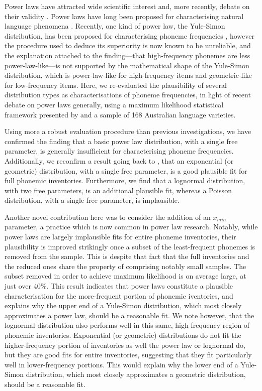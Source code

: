 Power laws have attracted wide scientific interest and, more recently, debate on their validity \autocites{clauset_power-law_2009}{stumpf_critical_2012}. Power laws have long been proposed for characterising natural language phenomena \autocites{estoup_gammes_1916}{zipf_selective_1932}{zipf_human_1949}. Recently, one kind of power law, the Yule-Simon distribution, has been proposed for characterising phoneme frequencies \autocites{martindale_comparison_1996}{tambovtsev_phoneme_2007}, however the procedure used to deduce its superiority is now known to be unreliable, and the explanation attached to the finding---that high-frequency phonemes are less power-law-like---is not supported by the mathematical shape of the Yule-Simon distribution, which is power-law-like for high-frequency items and geometric-like for low-frequency items. Here, we re-evaluated the plausibility of several distribution types as characterisations of phoneme frequencies, in light of recent debate on power laws generally, using a maximum likelihood statistical framework presented by \textcite{clauset_power-law_2009} and a sample of 168 Australian language varieties.

Using more a robust evaluation procedure than previous investigations, we have confirmed the finding that a basic power law distribution, with a single free parameter, is generally insufficient for characterising phoneme frequencies. Additionally, we reconfirm a result going back to \textcite{sigurd_rank-frequency_1968}, that an exponential (or geometric) distribution, with a single free parameter, is a good plausible fit for full phonemic inventories. Furthermore, we find that a lognormal distribution, with two free parameters, is an additional plausible fit, whereas a Poisson distribution, with a single free parameter, is implausible.

Another novel contribution here was to consider the addition of an \(x_{min}\) parameter, a practice which is now common in power law research. Notably, while power laws are largely implausible fits for entire phoneme inventories, their plausibility is improved strikingly once a subset of the least-frequent phonemes is removed from the sample. This is despite that fact that the full inventories and the reduced ones share the property of comprising notably small samples. The subset removed in order to achieve maximum likelihood is on average large, at just over 40\%. This result indicates that power laws constitute a plausible characterisation for the more-frequent portion of phonemic iventories, and explains why the upper end of a Yule-Simon distribution, which most closely approximates a power law, should be a reasonable fit. We note however, that the lognormal distribution also performs well in this same, high-frequency region of phonemic inventories. Exponential (or geometric) distributions do not fit the higher-frequency portion of inventories as well the power law or lognormal do, but they are good fits for entire inventories, suggesting that they fit particularly well in lower-frequency portions. This would explain why the lower end of a Yule-Simon distribution, which most closely approximates a geometric distribution, should be a reasonable fit.

